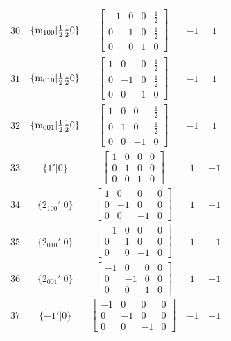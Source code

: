 \documentclass[fleqn,8pt]{jsarticle}
\begin{document}
\begin{longtable}{ccccc}
$ 30 $ & $ \{{\rm m}_{100}|\frac{1}{2} \frac{1}{2} 0\} $ & $ \begin{bmatrix} -1 & 0 & 0 & \frac{1}{2} \\ 0 & 1 & 0 & \frac{1}{2} \\ 0 & 0 & 1 & 0 \end{bmatrix} $ & $ -1 $ & $ 1 $ \\ \hline
$ 31 $ & $ \{{\rm m}_{010}|\frac{1}{2} \frac{1}{2} 0\} $ & $ \begin{bmatrix} 1 & 0 & 0 & \frac{1}{2} \\ 0 & -1 & 0 & \frac{1}{2} \\ 0 & 0 & 1 & 0 \end{bmatrix} $ & $ -1 $ & $ 1 $ \\ \hline
$ 32 $ & $ \{{\rm m}_{001}|\frac{1}{2} \frac{1}{2} 0\} $ & $ \begin{bmatrix} 1 & 0 & 0 & \frac{1}{2} \\ 0 & 1 & 0 & \frac{1}{2} \\ 0 & 0 & -1 & 0 \end{bmatrix} $ & $ -1 $ & $ 1 $ \\ \hline
$ 33 $ & $ \{1{}'|0\} $ & $ \begin{bmatrix} 1 & 0 & 0 & 0 \\ 0 & 1 & 0 & 0 \\ 0 & 0 & 1 & 0 \end{bmatrix} $ & $ 1 $ & $ -1 $ \\ \hline
$ 34 $ & $ \{2{}_{100}{}'|0\} $ & $ \begin{bmatrix} 1 & 0 & 0 & 0 \\ 0 & -1 & 0 & 0 \\ 0 & 0 & -1 & 0 \end{bmatrix} $ & $ 1 $ & $ -1 $ \\ \hline
$ 35 $ & $ \{2{}_{010}{}'|0\} $ & $ \begin{bmatrix} -1 & 0 & 0 & 0 \\ 0 & 1 & 0 & 0 \\ 0 & 0 & -1 & 0 \end{bmatrix} $ & $ 1 $ & $ -1 $ \\ \hline
$ 36 $ & $ \{2{}_{001}{}'|0\} $ & $ \begin{bmatrix} -1 & 0 & 0 & 0 \\ 0 & -1 & 0 & 0 \\ 0 & 0 & 1 & 0 \end{bmatrix} $ & $ 1 $ & $ -1 $ \\ \hline
$ 37 $ & $ \{-1{}'|0\} $ & $ \begin{bmatrix} -1 & 0 & 0 & 0 \\ 0 & -1 & 0 & 0 \\ 0 & 0 & -1 & 0 \end{bmatrix} $ & $ -1 $ & $ -1 $ \\ \hline

\end{longtable}
\end{document}
